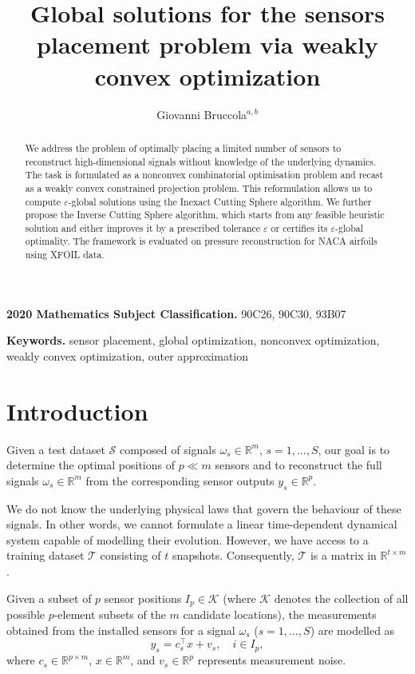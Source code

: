 \documentclass[12pt]{amsart}
\title[Global solutions for the sensors placement problem]
{Global solutions for the sensors placement problem via weakly convex optimization}
\author{Giovanni Bruccola${}^{a,b}$}
\theoremstyle{plain}
\theoremstyle{definition}
\begin{document}
\maketitle


\begin{abstract}
We address the problem of optimally placing a limited number of sensors to reconstruct high-dimensional signals without knowledge of the underlying dynamics. The task is formulated as a nonconvex combinatorial optimisation problem and recast as a weakly convex constrained projection problem. This reformulation allows us to compute $\varepsilon$-global solutions using the Inexact Cutting Sphere algorithm.
We further propose the Inverse Cutting Sphere algorithm, which starts from any feasible heuristic solution and either improves it by a prescribed tolerance $\varepsilon$ or certifies its $\varepsilon$-global optimality. 
The framework is evaluated on pressure reconstruction for NACA airfoils using XFOIL data. 
\end{abstract}

\begingroup
\footnotesize\noindent\textbf{2020 Mathematics Subject Classification.} 
90C26, 90C30, 93B07

\noindent\textbf{Keywords.} 
sensor placement, 
global optimization,
nonconvex optimization, 
weakly convex optimization,   
outer approximation
\par
\endgroup


		
\section{Introduction}

Given a test dataset $\mathcal{S}$ composed of signals $\omega_s \in \mathbb{R}^m$, $s = 1, \dots, S$, our goal is to determine the optimal positions of $p \ll m$ sensors and to reconstruct the full signals $\omega_s \in \mathbb{R}^m$ from the corresponding sensor outputs $y_s \in \mathbb{R}^p$.

We do not know the underlying physical laws that govern the behaviour of these signals. In other words, we cannot formulate a linear time-dependent dynamical system capable of modelling their evolution. However, we have access to a training dataset $\mathcal{T}$ consisting of $t$ snapshots. Consequently, $\mathcal{T}$ is a matrix in $\mathbb{R}^{t \times m}$.

Given a subset of $p$ sensor positions $I_p \in \mathcal{K}$ (where $\mathcal{K}$ denotes the collection of all possible $p$-element subsets of the $m$ candidate locations), the measurements obtained from the installed sensors for a signal $\omega_s$ ($s = 1, \dots, S$) are modelled as
\[
y_s = c_s^\top x + v_s, \quad i \in I_p,
\]
where $c_s \in \mathbb{R}^{p \times m}$, $x \in \mathbb{R}^m$, and $v_s \in \mathbb{R}^p$ represents measurement noise.
\end{document}

